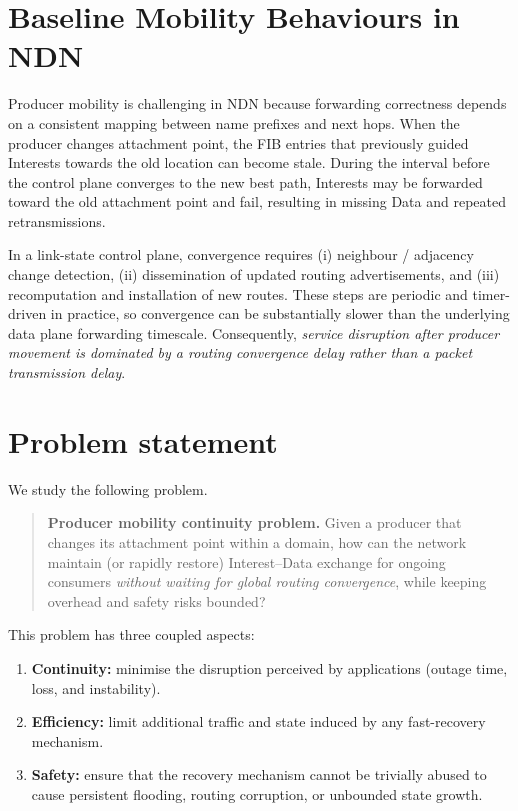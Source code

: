 
\section{Baseline Mobility Behaviours in NDN}
\label{sec:problem:baseline}

Producer mobility is challenging in NDN because forwarding correctness depends on a consistent mapping between name prefixes and next hops. When the producer changes attachment point, the FIB entries that previously guided Interests towards the old location can become stale. During the interval before the control plane converges to the new best path, Interests may be forwarded toward the old attachment point and fail, resulting in missing Data and repeated retransmissions.

In a link-state control plane, convergence requires (i) neighbour / adjacency change detection, (ii) dissemination of updated routing advertisements, and (iii) recomputation and installation of new routes. These steps are periodic and timer-driven in practice, so convergence can be substantially slower than the underlying data plane forwarding timescale. Consequently, \emph{service disruption after producer movement is dominated by a routing convergence delay rather than a packet transmission delay}.


\section{Problem statement}
\label{sec:problem:problem_statement}

We study the following problem.

\begin{quote}
    \textbf{Producer mobility continuity problem.} Given a producer that changes its attachment point within a domain, how can the network maintain (or rapidly restore) Interest--Data exchange for ongoing consumers \emph{without waiting for global routing convergence}, while keeping overhead and safety risks bounded?
\end{quote}

This problem has three coupled aspects:

\begin{enumerate}
  \item \textbf{Continuity:} minimise the disruption perceived by applications (outage time, loss, and instability).
  \item \textbf{Efficiency:} limit additional traffic and state induced by any fast-recovery mechanism.
  \item \textbf{Safety:} ensure that the recovery mechanism cannot be trivially abused to cause persistent flooding, routing corruption, or unbounded state growth.
\end{enumerate}

